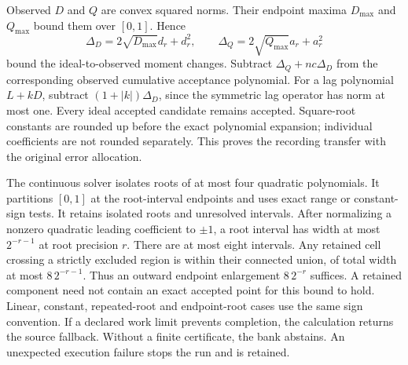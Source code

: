 Observed $D$ and $Q$ are convex squared norms. Their endpoint maxima $D_{\max}$ and $Q_{\max}$ bound them over $[0,1]$. Hence
\begin{equation}\label{src16:si-relaxation}
 \Delta_D=2\sqrt{D_{\max}}d_r+d_r^2,\qquad
 \Delta_Q=2\sqrt{Q_{\max}}a_r+a_r^2
\end{equation}
bound the ideal-to-observed moment changes. Subtract $\Delta_Q+nc\Delta_D$ from the corresponding observed cumulative acceptance polynomial. For a lag polynomial $L+kD$, subtract $(1+|k|)\Delta_D$, since the symmetric lag operator has norm at most one. Every ideal accepted candidate remains accepted. Square-root constants are rounded up before the exact polynomial expansion; individual coefficients are not rounded separately. This proves the recording transfer with the original error allocation.

The continuous solver isolates roots of at most four quadratic polynomials. It partitions $[0,1]$ at the root-interval endpoints and uses exact range or constant-sign tests. It retains isolated roots and unresolved intervals. After normalizing a nonzero quadratic leading coefficient to $\pm1$, a root interval has width at most $2^{-r-1}$ at root precision $r$. There are at most eight intervals. Any retained cell crossing a strictly excluded region is within their connected union, of total width at most $8\,2^{-r-1}$. Thus an outward endpoint enlargement $8\,2^{-r}$ suffices. A retained component need not contain an exact accepted point for this bound to hold. Linear, constant, repeated-root and endpoint-root cases use the same sign convention. If a declared work limit prevents completion, the calculation returns the source fallback. Without a finite certificate, the bank abstains. An unexpected execution failure stops the run and is retained.

